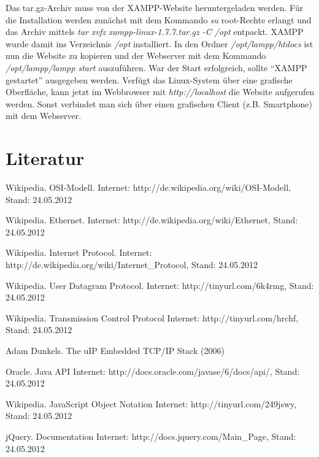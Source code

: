 \documentclass[a4paper,14pt,headsepline]{scrartcl}
\begin{document}
Das tar.gz-Archiv muss von der XAMPP-Website heruntergeladen werden. Für die Installation werden zunächst mit dem Kommando \textit{su} root-Rechte erlangt und das Archiv mittels \textit{tar xvfz xampp-linux-1.7.7.tar.gz -C /opt} entpackt. XAMPP wurde damit ins Verzeichnis \textit{/opt} installiert. In den Ordner \linebreak \textit{/opt/lampp/htdocs} ist nun die Website zu kopieren und der Webserver mit dem Kommando \textit{/opt/lampp/lampp start} auszuführen. War der Start erfolgreich, sollte ``XAMPP gestartet'' ausgegeben werden. Verfügt das Linux-System über eine grafische Oberfläche, kann jetzt im Webbrowser mit \textit{http://localhost} die Website aufgerufen werden. Sonst verbindet man sich über einen grafischen Client (z.B. Smartphone) mit dem Webserver.

\newpage
{}
\section*{Literatur}
Wikipedia. OSI-Modell.\newline
Internet: http://de.wikipedia.org/wiki/OSI-Modell, Stand: 24.05.2012

Wikipedia. Ethernet.\newline
Internet: http://de.wikipedia.org/wiki/Ethernet, Stand: 24.05.2012

Wikipedia. Internet Protocol.\newline
Internet: http://de.wikipedia.org/wiki/Internet\_Protocol, Stand: 24.05.2012

Wikipedia. User Datagram Protocol.\newline
Internet: http://tinyurl.com/6k4rmg, Stand: 24.05.2012

Wikipedia. Transmission Control Protocol\newline
Internet: http://tinyurl.com/hrchf, Stand: 24.05.2012

Adam Dunkels. The uIP Embedded TCP/IP Stack (2006)

Oracle. Java API\newline
Internet: http://docs.oracle.com/javase/6/docs/api/, Stand: 24.05.2012

Wikipedia. JavaScript Object Notation\newline
Internet: http://tinyurl.com/249jswy, Stand: 24.05.2012

jQuery. Documentation\newline
Internet: http://docs.jquery.com/Main\_Page, Stand: 24.05.2012
\end{document}
